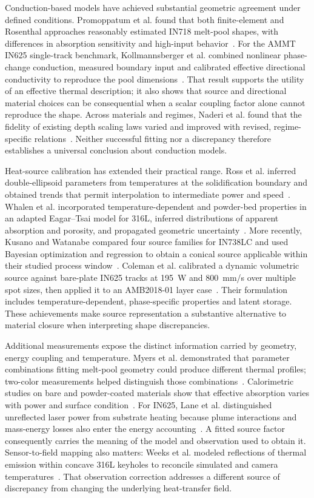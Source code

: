 Conduction-based models have achieved substantial geometric agreement under defined conditions. Promoppatum et al. found that both finite-element and Rosenthal approaches reasonably estimated IN718 melt-pool shapes, with differences in absorption sensitivity and high-input behavior~\cite{promoppatum2017}. For the AMMT IN625 single-track benchmark, Kollmannsberger et al. combined nonlinear phase-change conduction, measured boundary input and calibrated effective directional conductivity to reproduce the pool dimensions~\cite{kollmannsberger2019}. That result supports the utility of an effective thermal description; it also shows that source and directional material choices can be consequential when a scalar coupling factor alone cannot reproduce the shape. Across materials and regimes, Naderi et al. found that the fidelity of existing depth scaling laws varied and improved with revised, regime-specific relations~\cite{naderi2023}. Neither successful fitting nor a discrepancy therefore establishes a universal conclusion about conduction models.

Heat-source calibration has extended their practical range. Ross et al. inferred double-ellipsoid parameters from temperatures at the solidification boundary and obtained trends that permit interpolation to intermediate power and speed~\cite{ross2022}. Whalen et al. incorporated temperature-dependent and powder-bed properties in an adapted Eagar--Tsai model for 316L, inferred distributions of apparent absorption and porosity, and propagated geometric uncertainty~\cite{whalen2021}. More recently, Kusano and Watanabe compared four source families for IN738LC and used Bayesian optimization and regression to obtain a conical source applicable within their studied process window~\cite{heatsourcebayes2024}. Coleman et al. calibrated a dynamic volumetric source against bare-plate IN625 tracks at 195~W and 800~mm/s over multiple spot sizes, then applied it to an AMB2018-01 layer case~\cite{dynamic2024}. Their formulation includes temperature-dependent, phase-specific properties and latent storage. These achievements make source representation a substantive alternative to material closure when interpreting shape discrepancies.

Additional measurements expose the distinct information carried by geometry, energy coupling and temperature. Myers et al. demonstrated that parameter combinations fitting melt-pool geometry could produce different thermal profiles; two-color measurements helped distinguish those combinations~\cite{myers2023}. Calorimetric studies on bare and powder-coated materials show that effective absorption varies with power and surface condition~\cite{trapp2017}. For IN625, Lane et al. distinguished unreflected laser power from substrate heating because plume interactions and mass-energy losses also enter the energy accounting~\cite{lane2020absorption}. A fitted source factor consequently carries the meaning of the model and observation used to obtain it. Sensor-to-field mapping also matters: Weeks et al. modeled reflections of thermal emission within concave 316L keyholes to reconcile simulated and camera temperatures~\cite{weeks2026}. That observation correction addresses a different source of discrepancy from changing the underlying heat-transfer field.

